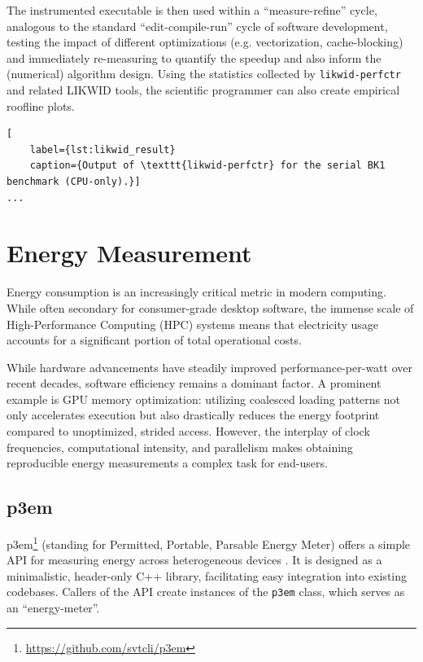 \documentclass[a4paper,12pt]{article}
\begin{document}
The instrumented executable is then used within a ``measure-refine'' cycle, analogous
to the standard ``edit-compile-run'' cycle of software development, testing
the impact of different optimizations (e.g. vectorization, cache-blocking) and
immediately re-measuring to quantify the speedup and also inform the (numerical) algorithm design.
Using the statistics collected by \texttt{likwid-perfctr} and related LIKWID tools,
the scientific programmer can also create empirical roofline plots.

\begin{lstlisting}[
    label={lst:likwid_result}
    caption={Output of \texttt{likwid-perfctr} for the serial BK1 benchmark (CPU-only).}]
...
\end{lstlisting}

\newpage
\section{{Energy Measurement}}
\label{sec:section4}

Energy consumption is an increasingly critical metric in modern computing.
While often secondary for consumer-grade desktop software, the immense scale of
High-Performance Computing (HPC) systems means that electricity usage
accounts for a significant portion of total operational costs.

While hardware advancements have steadily improved performance-per-watt over recent decades, software efficiency remains a dominant factor. A prominent example is GPU memory optimization: utilizing coalesced loading patterns not only accelerates execution but also drastically reduces the energy footprint compared to unoptimized, strided access. However, the interplay of clock frequencies, computational intensity, and parallelism makes obtaining reproducible energy measurements a complex task for end-users.

\subsection{{p3em}}

p3em\footnote{\url{https://github.com/svtcli/p3em}} (standing for Permitted, Portable, Parsable Energy Meter)
offers a simple API for measuring energy across heterogeneous devices \cite{Cielo2025}.
It is designed as a minimalistic, header-only C++ library, facilitating
easy integration into existing codebases.
Callers of the API create instances of the \texttt{p3em} class, which serves as an ``energy-meter''.
\end{document}
